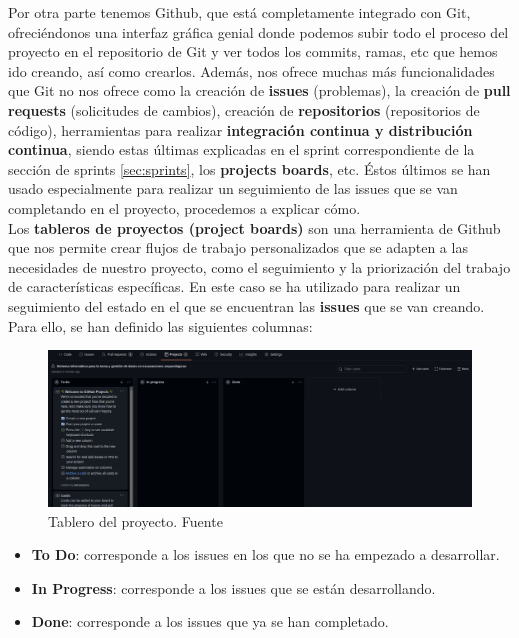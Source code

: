 Por otra parte tenemos Github, que está completamente integrado con Git, ofreciéndonos una
interfaz gráfica genial donde podemos subir todo el proceso del proyecto en el repositorio
de Git y ver todos los commits, ramas, etc que hemos ido creando, así como crearlos.
Además, nos ofrece muchas más funcionalidades que Git no nos ofrece como la creación de
\textbf{issues} (problemas), la creación de \textbf{pull requests} (solicitudes de cambios),
creación de \textbf{repositorios} (repositorios de código), herramientas para realizar
\textbf{integración continua y distribución continua}, siendo estas últimas explicadas
en el sprint correspondiente de la sección de sprints \ref{sec:sprints}, los 
\textbf{projects boards}, etc. Éstos últimos se han usado especialmente para realizar un
seguimiento de las issues que se van completando en el proyecto, procedemos a explicar
cómo.\\

Los \textbf{tableros de proyectos (project boards)} \cite{project-boards} son una
herramienta de Github que nos permite crear flujos de trabajo personalizados que se adapten
a las necesidades de nuestro proyecto, como el seguimiento y la priorización del trabajo de
características específicas. En este caso se ha utilizado para realizar un seguimiento
del estado en el que se encuentran las \textbf{issues} que se van creando. Para ello, se
han definido las siguientes columnas:

    \begin{figure}[H]
        \centering
        \includegraphics[scale=0.19]{imagenes/project-board.png}
        \caption[Tablero del proyecto]{Tablero del proyecto. Fuente \cite{project-board-image}}
        \label{fig:project-board}
    \end{figure}

    \begin{itemize}
        \item \textbf{To Do}: corresponde a los issues en los que no se ha empezado a
        desarrollar.
        \item \textbf{In Progress}: corresponde a los issues que se están desarrollando.
        \item \textbf{Done}: corresponde a los issues que ya se han completado.
    \end{itemize}

